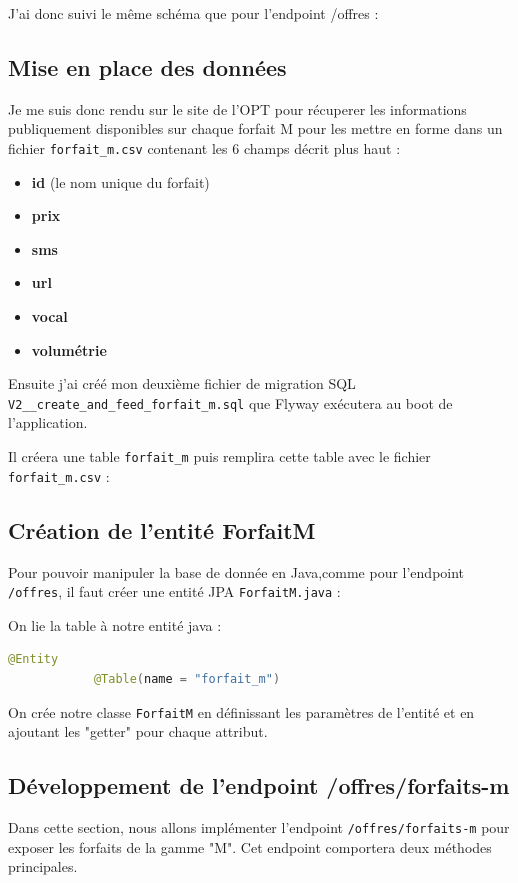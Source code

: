 \documentclass[11pt]{article}
\begin{document}
		J'ai donc suivi le même schéma que pour l'endpoint /offres :
		
		\subsection*{Mise en place des données}
		\label{subsec:mpd}
		Je me suis donc rendu sur le site de l'OPT pour récuperer les informations publiquement disponibles sur chaque forfait M pour les mettre en forme dans un fichier \texttt{forfait\_m.csv}
		contenant les 6 champs décrit plus haut : 
		\begin{itemize} 
			\item \textbf{id} (le nom unique du forfait)
			\item \textbf{prix}
			\item \textbf{sms}
			\item \textbf{url}
			\item \textbf{vocal}
			\item \textbf{volumétrie}
		\end{itemize}
		
		Ensuite j'ai créé mon deuxième fichier de migration SQL \texttt{V2\_\_create\_and\_feed\_forfait\_m.sql} que Flyway exécutera au boot de l'application. 
		
		Il créera une table \texttt{forfait\_m} puis remplira cette table avec le fichier \texttt{forfait\_m.csv} : 
		\subsection*{Création de l'entité ForfaitM}
		\label{subsec:JPA}
		Pour pouvoir manipuler la base de donnée en Java,comme pour l'endpoint \texttt{/offres}, il faut créer une entité JPA \texttt{ForfaitM.java} :
		
		On lie la table à notre entité java :
		\begin{lstlisting}[language=java]
			@Entity
			@Table(name = "forfait_m") 
		\end{lstlisting}
		
		On crée notre classe \texttt{ForfaitM} en définissant les paramètres de l'entité et en ajoutant les "getter" pour chaque attribut.
			
		\subsection*{Développement de l'endpoint /offres/forfaits-m}
		\label{subsec:endpoint-m}
		Dans cette section, nous allons implémenter l'endpoint \texttt{/offres/forfaits-m} pour exposer les forfaits de la gamme "M". Cet endpoint comportera deux méthodes principales.
		
\end{document}
